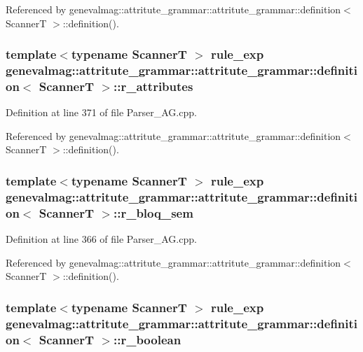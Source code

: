 Referenced by genevalmag::attritute\_\-grammar::attritute\_\-grammar::definition$<$ ScannerT $>$::definition().\hypertarget{structgenevalmag_1_1attritute__grammar_1_1definition_20b00d1c2e96af9155438d1e603f4563}{
\subsubsection[{r\_\-attributes}]{\setlength{\rightskip}{0pt plus 5cm}template$<$typename ScannerT $>$ {\bf rule\_\-exp} genevalmag::attritute\_\-grammar::attritute\_\-grammar::definition$<$ ScannerT $>$::{\bf r\_\-attributes}}}
\label{structgenevalmag_1_1attritute__grammar_1_1definition_20b00d1c2e96af9155438d1e603f4563}




Definition at line 371 of file Parser\_\-AG.cpp.

Referenced by genevalmag::attritute\_\-grammar::attritute\_\-grammar::definition$<$ ScannerT $>$::definition().\hypertarget{structgenevalmag_1_1attritute__grammar_1_1definition_d91a16e593c63256622e096e7e2bf627}{
\subsubsection[{r\_\-bloq\_\-sem}]{\setlength{\rightskip}{0pt plus 5cm}template$<$typename ScannerT $>$ {\bf rule\_\-exp} genevalmag::attritute\_\-grammar::attritute\_\-grammar::definition$<$ ScannerT $>$::{\bf r\_\-bloq\_\-sem}}}
\label{structgenevalmag_1_1attritute__grammar_1_1definition_d91a16e593c63256622e096e7e2bf627}




Definition at line 366 of file Parser\_\-AG.cpp.

Referenced by genevalmag::attritute\_\-grammar::attritute\_\-grammar::definition$<$ ScannerT $>$::definition().\hypertarget{structgenevalmag_1_1attritute__grammar_1_1definition_eeb076547d96dab985354edb99090808}{
\subsubsection[{r\_\-boolean}]{\setlength{\rightskip}{0pt plus 5cm}template$<$typename ScannerT $>$ {\bf rule\_\-exp} genevalmag::attritute\_\-grammar::attritute\_\-grammar::definition$<$ ScannerT $>$::{\bf r\_\-boolean}}}
\label{structgenevalmag_1_1attritute__grammar_1_1definition_eeb076547d96dab985354edb99090808}




